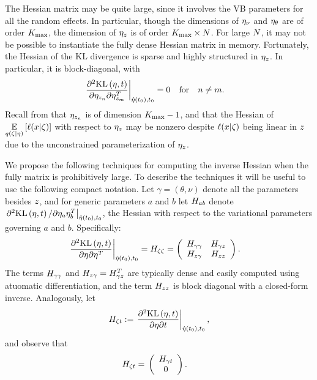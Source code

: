 The Hessian matrix may be quite large, since it involves the VB parameters for
all the random effects.  In particular, though the dimensions of $\eta_{\nu}$ and
$\eta_{\theta}$ are of order ${K_{\mathrm{max}}}$, the dimension of $\eta_{z}$ is of order ${K_{\mathrm{max}}}
\times N$.  For large $N$, it may not be possible to instantiate the fully
dense Hessian matrix in memory.  Fortunately, the Hessian of the KL divergence
is sparse and highly structured in $\eta_{z}$.  In particular, it is
block-diagonal, with
%
\begin{align*}
%
\fracat{\partial^2 \KL{\eta, \t}}
       {\partial \eta_{\z_{n}} \partial \eta_{\z_{m}}^T}
       {\etaopt(\t_0), \t_0} ={}& 0 \mathtxt{for}n\ne m.
%
\end{align*}
%
Recall from  that $\eta_{z_n}$ is of dimension ${K_{\mathrm{max}}} -
1$, and that the Hessian of $\underset{q(\zeta \vert \eta)}{\mathbb{E}}\left[\ell(x \vert
\zeta)\right]$ with respect to $\eta_{z}$ may be nonzero despite $\ell(x \vert \zeta)$
being linear in $z$ due to the unconstrained parameterization of $\eta_{z}$.

We propose the following techniques for computing the inverse Hessian when the
fully matrix is prohibitively large.  To describe the techniques it will be
useful to use the following compact notation.  Let $\gamma = (\theta, \nu)$
denote all the parameters besides $z$, and for generic parameters $a$ and $b$
let $H_{ab}$ denote $\left.\partial^2 \mathrm{KL}\left(\eta, t\right) / \partial \eta_a
\eta_b^T\right|_{\hat\eta(t_0), t_0}$, the Hessian with respect to the variational
parameters governing $a$ and $b$.  Specifically:
%
\begin{align*}
%
\fracat{\partial^2 \KL{\eta, \t}}
       {\partial \eta \partial \eta^T}
       {\etaopt(\t_0), \t_0} ={}&
\hess{\zeta\zeta} =
\left(
\begin{array}{cc}
   \hess{\gamma\gamma} & \hess{\gamma\z} \\
   \hess{\z\gamma}     & \hess{\z\z} \\
\end{array}
\right).
%
\end{align*}
%
The terms $H_{\gamma\gamma}$ and $H_{z\gamma} = H_{\gamma z}^T$ are
typically dense and easily computed using atuomatic differentiation, and the
term $H_{zz}$ is block diagonal with a closed-form inverse.
%
Analogously, let
%
\begin{align*}
%
\hess{\zeta\t} :=
\fracat{\partial^2 \KL{\eta, \t}}
       {\partial \eta \partial \t}
       {\etaopt(\t_0), \t_0},
%
\end{align*}
%
and observe that
%
\begin{align*}
%
\hess{\zeta\t} ={}& \left( \begin{array}{c} \hess{\gamma\t} \\ 0 \end{array}\right).
%
\end{align*}

